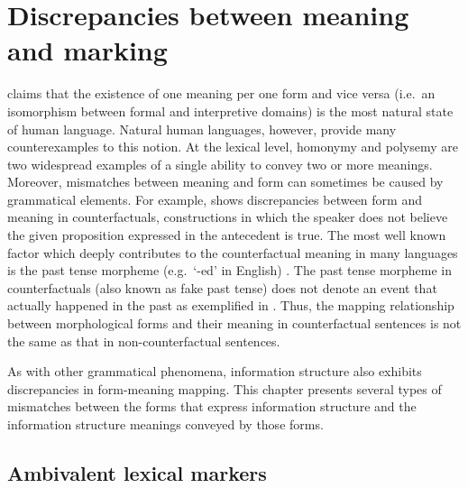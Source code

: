 \chapter{Discrepancies between meaning and marking}
\label{chapter5}
\setcounter{enums}{0}

\noindent \citet{bolinger:77} claims that the existence of one meaning
per one form and vice versa (i.e.\ an isomorphism between formal and
interpretive domains) is the most natural state of human language.
Natural human languages, however, provide many counterexamples to this
notion.  At the lexical level, homonymy and polysemy are two
widespread examples of a single ability to convey two or more
meanings.  Moreover, mismatches between meaning and form can sometimes
be caused by grammatical elements. For example,  shows
discrepancies between form and meaning in counterfactuals,
constructions in which the speaker does not believe the given
proposition expressed in the antecedent is true. The most well known
factor which deeply contributes to the counterfactual meaning in many
languages is the past tense morpheme (e.g.\ `-ed' in English)
\citep{iatridou:00}.  The past tense morpheme in counterfactuals (also
known as fake past tense) does not denote an event that actually
happened in the past as exemplified in . Thus, the
mapping relationship between morphological forms and their meaning in
counterfactual sentences is not the same as that in non-counterfactual
sentences.



As with other grammatical phenomena, information structure also
exhibits discrepancies in form-meaning mapping. This chapter presents
several types of mismatches between the forms that express information
structure and the information structure meanings conveyed by those
forms.





\section{Ambivalent lexical markers}
\label{5:sec:lex}


